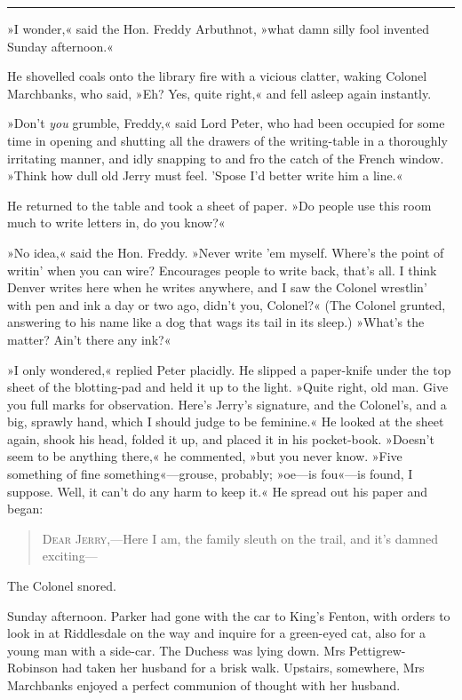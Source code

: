 \noindent\hfil\rule{0.5\textwidth}{.4pt}\hfil

»I wonder,« said the Hon. Freddy Arbuthnot, »what damn silly fool invented Sunday afternoon.«

He shovelled coals onto the library fire with a vicious clatter, waking Colonel Marchbanks, who said, »Eh? Yes, quite right,« and fell asleep again instantly.

»Don't \textit{you} grumble, Freddy,« said Lord Peter, who had been occupied for some time in opening and shutting all the drawers of the writing-table in a thoroughly irritating manner, and idly snapping to and fro the catch of the French window. »Think how dull old Jerry must feel. 'Spose I'd better write him a line.«

He returned to the table and took a sheet of paper. »Do people use this room much to write letters in, do you know?«

»No idea,« said the Hon. Freddy. »Never write 'em myself. Where's the point of writin' when you can wire? Encourages people to write back, that's all. I think Denver writes here when he writes anywhere, and I saw the Colonel wrestlin' with pen and ink a day or two ago, didn't you, Colonel?« (The Colonel grunted, answering to his name like a dog that wags its tail in its sleep.) »What's the matter? Ain't there any ink?«

»I only wondered,« replied Peter placidly. He slipped a paper-knife under the top sheet of the blotting-pad and held it up to the light.  »Quite right, old man. Give you full marks for observation. Here's Jerry's signature, and the Colonel's, and a big, sprawly hand, which I should judge to be feminine.« He looked at the sheet again, shook his head, folded it up, and placed it in his pocket-book. »Doesn't seem to be anything there,« he commented, »but you never know. »Five something of fine something«—grouse, probably; »oe—is fou«—is found, I suppose. Well, it can't do any harm to keep it.« He spread out his paper and began:

\begin{quote}
\textsc{Dear Jerry},—Here I am, the family sleuth on the trail, and it's damned exciting—
\end{quote}

The Colonel snored.

Sunday afternoon. Parker had gone with the car to King's Fenton, with orders to look in at Riddlesdale on the way and inquire for a green-eyed cat, also for a young man with a side-car. The Duchess was lying down. Mrs Pettigrew-Robinson had taken her husband for a brisk walk. Upstairs, somewhere, Mrs Marchbanks enjoyed a perfect communion of thought with her husband.

